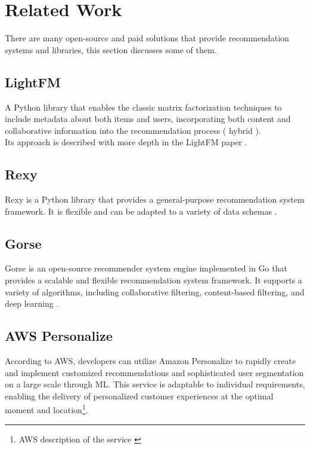 \section{Related Work}

There are many open-source and paid solutions that provide recommendation systems and libraries, this section discusses some of them.

\subsection{LightFM}
A Python library that enables the classic matrix factorization techniques to include metadata about both items and users, incorporating both content and collaborative information into the recommendation process ( hybrid )\cite{LightFM}.  \\

Its approach is described with more depth in the LightFM paper \cite{kula2015metadata}.

\subsection{Rexy}
Rexy \cite{Rexy} is a Python library that provides a general-purpose recommendation system framework. It is flexible and can be adapted to a variety of data schemas \cite{Rexy}.

\subsection{Gorse}
Gorse \cite{Gorse} is an open-source recommender system engine implemented in Go that provides a scalable and flexible recommendation system framework. It supports a variety of algorithms, including collaborative filtering, content-based filtering, and deep learning \cite{Rexy}.

\subsection{AWS Personalize}
According to AWS, developers can utilize Amazon Personalize \cite{AWSPersonalize} to rapidly create and implement customized recommendations and sophisticated user segmentation on a large scale through ML. This service is adaptable to individual requirements, enabling the delivery of personalized customer experiences at the optimal moment and location\footnote{AWS description of the service \cite{AWSPersonalize} }. \\

